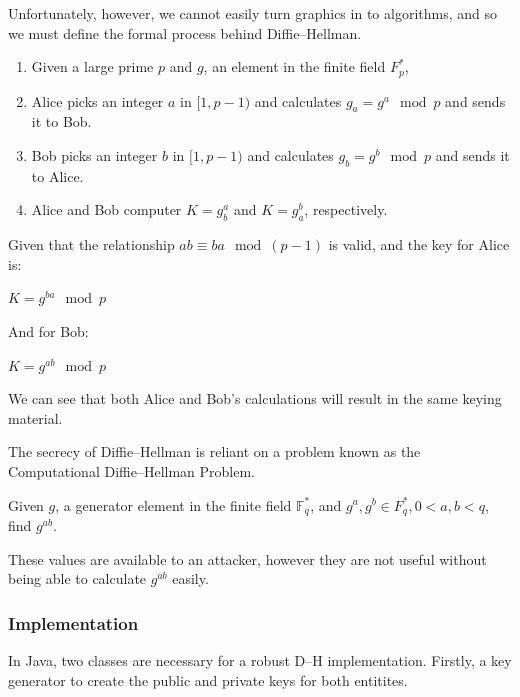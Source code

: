   Unfortunately, however, we cannot easily turn graphics in to algorithms, and so we must define the formal process behind Diffie--Hellman\cite{Mao:2003uq}.
  
  \begin{enumerate}
    \item Given a large prime $p$ and $g$, an element in the finite field $F_p^*$,
    \item Alice picks an integer $a$ in $[1,p-1)$ and calculates $g_a = g^a \mod p$ and sends it to Bob.
    \item Bob picks an integer $b$ in $[1,p-1)$ and calculates $g_b = g^b \mod p$ and sends it to Alice.
    \item Alice and Bob computer $K = g_b^a$ and $K = g_a^b$, respectively.
  \end{enumerate}
  
  Given that the relationship $ab \equiv ba \mod (p-1)$ is valid, and the key for Alice is:
  
  \begin{center}
    $K = g^{ba} \mod p$
  \end{center}
  
  And for Bob:
  
  \begin{center}
    $K = g^{ab} \mod p$
  \end{center}
  
  We can see that both Alice and Bob's calculations will result in the same keying material.
  
  The secrecy of Diffie--Hellman is reliant on a problem known as the Computational Diffie--Hellman Problem. 
  
  \begin{mathdef}
    Given $g$, a generator element in the finite field $\mathbb{F}_q^*$, and ${g^a,g^b} \in F_q^*, 0 < a, b < q$, find $g^{ab}$.
  \end{mathdef}
  
  These values are available to an attacker, however they are not useful without being able to calculate $g^{ab}$ easily.
  
    \subsubsection{Implementation}
    
    In Java, two classes are necessary for a robust D--H implementation. Firstly, a key generator to create the public and private keys for both entitites. \\
    

